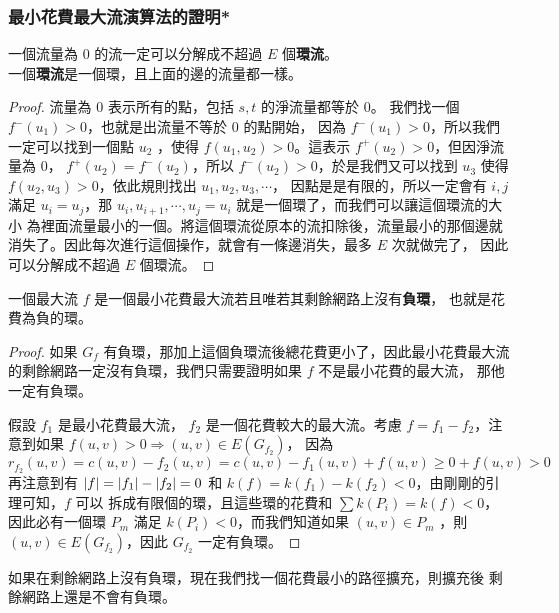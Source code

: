 \documentclass[a4paper,12pt]{book}
\begin{document}
\subsubsection{最小花費最大流演算法的證明*}
\begin{lemma}
  一個流量為 $0$ 的流一定可以分解成不超過 $E$ 個{\bf 環流}。\\
  一個{\bf 環流}是一個環，且上面的邊的流量都一樣。
\end{lemma}
\begin{proof}
  流量為 $0$ 表示所有的點，包括 $s, t$ 的淨流量都等於 $0$。
  我們找一個 $f^-(u_1) > 0$，也就是出流量不等於 $0$ 的點開始，
  因為 $f^-(u_1) > 0$，所以我們一定可以找到一個點 $u_2$ ，使得
  $f(u_1, u_2) > 0$。這表示 $f^+(u_2) > 0$，但因淨流量為 $0$，
  $f^+(u_2) = f^-(u_2)$，所以 $f^-(u_2) > 0$，於是我們又可以找到
  $u_3$ 使得 $f(u_2, u_3) > 0$，依此規則找出 $u_1, u_2, u_3, \cdots$，
  因點是是有限的，所以一定會有 $i, j$ 滿足 $u_i = u_j$，那
  $u_i, u_{i+1}, \cdots, u_j = u_i$ 就是一個環了，而我們可以讓這個環流的大小
  為裡面流量最小的一個。將這個環流從原本的流扣除後，流量最小的那個邊就
  消失了。因此每次進行這個操作，就會有一條邊消失，最多 $E$ 次就做完了，
  因此可以分解成不超過 $E$ 個環流。
\end{proof}
\begin{simthm}
  一個最大流 $f$ 是一個最小花費最大流若且唯若其剩餘網路上沒有{\bf 負環}，
  也就是花費為負的環。
\end{simthm}
\begin{proof}
  如果 $G_f$ 有負環，那加上這個負環流後總花費更小了，因此最小花費最大流
  的剩餘網路一定沒有負環，我們只需要證明如果 $f$ 不是最小花費的最大流，
  那他一定有負環。

  假設 $f_1$ 是最小花費最大流， $f_2$ 是一個花費較大的最大流。考慮 
  $f = f_1 - f_2$，注意到如果 $f(u, v) > 0 \Rightarrow (u, v) \in E(G_{f_2})$，
  因為 
  \[ r_{f_2}(u, v) = c(u, v) - f_2(u, v) = c(u, v) - f_1(u, v) + f(u, v)
    \geq 0 + f(u, v) > 0 \]
  再注意到有 $\lvert f \rvert = \lvert f_1 \rvert - \lvert f_2 \rvert = 0$ 和 
  $k(f) = k(f_1) - k(f_2) < 0$，由剛剛的引理可知，$f$ 可以
  拆成有限個的環，且這些環的花費和 $\sum k(P_i) = k(f) < 0$，
  因此必有一個環 $P_m$ 滿足 $k(P_i) < 0$，而我們知道如果 $(u, v) \in P_m$
  ，則 $(u, v) \in E(G_{f_2})$，因此 $G_{f_2}$ 一定有負環。
\end{proof}
\begin{simthm}
  如果在剩餘網路上沒有負環，現在我們找一個花費最小的路徑擴充，則擴充後
  剩餘網路上還是不會有負環。
\end{simthm}
\end{document}
